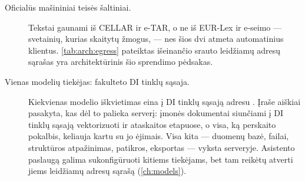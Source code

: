 \begin{description}
  \item[Oficialūs mašininiai teisės šaltiniai.] Tekstai gaunami iš CELLAR ir e-TAR, o ne iš
    EUR-Lex ir e-seimo --- svetainių, kurias skaitytų žmogus, --- nes šios dvi atmeta
    automatinius klientus. \cref{tab:arch:egress} pateiktas išeinančio srauto leidžiamų
    adresų sąrašas yra architektūrinis šio sprendimo pėdsakas.

  \item[Vienas modelių tiekėjas: fakulteto DI tinklų sąsaja.] Kiekvienas modelio iškvietimas
    eina į DI tinklų sąsają adresu . Įraše aiškiai pasakyta, kas dėl to
    palieka serverį: įmonės dokumentai siunčiami į DI tinklų sąsają vektorizuoti ir
    ataskaitos etapuose, o visa, ką perskaito pokalbis, keliauja kartu su jo ėjimais. Visa
    kita --- duomenų bazė, failai, struktūros atpažinimas, patikros, eksportas --- vyksta
    serveryje. Asistento paslaugą galima sukonfigūruoti kitiems tiekėjams, bet tam reikėtų
    atverti jiems leidžiamų adresų sąrašą (\cref{ch:models}).
\end{description}
